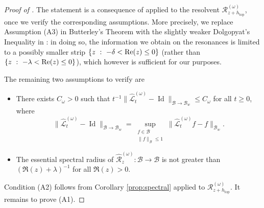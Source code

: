 \documentclass[11pt,letterpaper]{amsart}
\newcommand \cL {{\mathcal L}}
\newcommand \cR {{\mathcal R}}
\newcommand \cB {{\mathscr B}}
\newcommand \re {{%
\operatorname{Re}
}}
\DeclareMathOperator{\topp}{top}
\theoremstyle{definition}
\begin{document}
\begin{proof}[Proof of ]
The statement is a consequence of \cite[Theorem 1]{But} applied to the resolvent $\mathscr{R}_{z+h_{\topp}}^{(\omega)}$, once we verify the corresponding assumptions.
More precisely, we replace Assumption (A3) in Butterley's Theorem with the slightly weaker Dolgopyat's Inequality in : in doing so, the information we obtain on the resonances is limited to a possibly smaller strip $\{ z \ : \ -\delta < \re(z) \leq 0 \}$ (rather than $\{ z \ : \ -\lambda < \re(z) \leq 0 \}$), which however is sufficient for our purposes.

The remaining two assumptions to verify are
\begin{itemize}
\item[(A1)] There exists $C_\omega>0$ such that $t^{-1}\|\hat \cL_t^{(\omega)}- \operatorname{Id}\|_{\cB \to \cB_w}\le C_\omega$ for all $t \ge 0$,
{
where
\[
\|\hat \cL_t^{(\omega)}- \operatorname{Id}\|_{\cB \to \cB_w}=\sup_{\substack{f\in \cB \\ \|f\|_{\cB}\le 1} }\|\hat \cL_t^{(\omega)} f-f\|_{\cB_w}.
\]
}
\item[(A2)] {  The essential spectral radius of $\hat\cR_{z}^{(\omega)}: \cB\to \cB$ is not greater than $(\Re(z) + \lambda)^{-1}$ for all $\Re(z) >0$.}\\
\end{itemize}
Condition (A2) follows  from Corollary \ref{prop:spectral} applied to $\mathcal{R}^{(\omega)}_{z+h_{\topp}}$. 
It remains to prove (A1). 


\end{proof}
\end{document}
